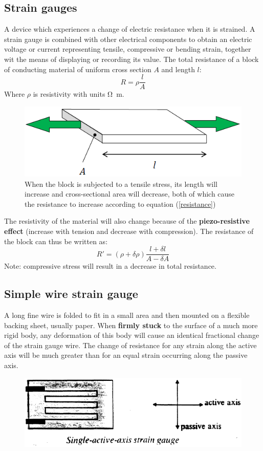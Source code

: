 \documentclass[class=report, crop=false, 12pt,a4paper]{standalone}
\begin{document}
\subsection{Strain gauges}
A device which experiences a change of electric resistance when it is strained. A strain gauge is combined with other electrical components to obtain an electric voltage or current representing tensile, compressive or bending strain, together wit the means of displaying or recording its value. The total resistance of a block of conducting material of uniform cross section $A$ and length $l$:
\begin{equation}
  R = \rho \frac{l}{A}
  \label{resistance}
\end{equation}
Where $\rho$ is resistivity with units \si{\ohm \meter}.
\begin{figure}[H]
  \centering
  \includegraphics[width = 0.8 \textwidth]{../img/diagram9.png}
  \caption{When the block is subjected to a tensile stress, its length will increase and cross-sectional area will decrease, both of which cause the resistance to increase according to equation (\ref{resistance})}
\end{figure}
The resistivity of the material will also change because of the \textbf{piezo-resistive effect} (increase with tension and decrease with compression). The resistance of the block can thus be written as:
\begin{equation}
  R' = (\rho + \delta \rho) \frac{l + \delta l}{A - \delta A}
\end{equation}
Note: compressive stress will result in a decrease in total resistance.
\subsection{Simple wire strain gauge}
A long fine wire is folded to fit in a small area and then mounted on a flexible backing sheet, usually paper. When \textbf{firmly stuck} to the surface of a much more rigid body, any deformation of this body will cause an identical fractional change of the strain gauge wire. The change of resistance for any strain along the active axis will be much greater than for an equal strain occurring along the passive axis.
\begin{figure}[H]
  \centering
  \includegraphics[width = 0.8 \textwidth]{../img/diagram10.png}
\end{figure}
\end{document}
